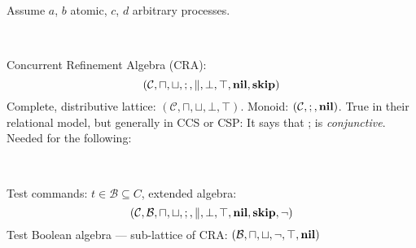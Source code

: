 \newpage
{}


Assume $a$, $b$ atomic, $c$, $d$ arbitrary processes.

~

Concurrent Refinement Algebra (CRA):
\[
(\mathcal C,\sqcap,\sqcup,;,\parallel,\bot,\top,\mathbf{nil},\mathbf{skip})
\]
Complete, distributive lattice:
$
(\mathcal C,\sqcap,\sqcup,\bot,\top)
$.
Monoid:
$
  (\mathcal C, ;, \mathbf{nil})
$.
True in their relational model, but generally in CCS or CSP:
It says that ; is \emph{conjunctive}.
Needed for the following:

~

Test commands: $t \in \mathcal B \subseteq C$, extended algebra:
\[
(\mathcal C,\mathcal B,\sqcap,\sqcup,;,\parallel,\bot,\top,\mathbf{nil},\mathbf{skip},\lnot)
\]
Test Boolean algebra --- sub-lattice of CRA:
$
(\mathcal B,\sqcap,\sqcup,\lnot,\top,\mathbf{nil})
$

